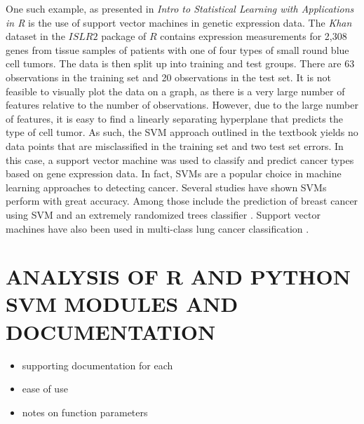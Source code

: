 \documentclass[12pt]{article}
\begin{document}
One such example, as presented in \textit{Intro to Statistical Learning with Applications in R} \citep{introstatlearning} is the use of support vector machines in genetic expression data. The \textit{Khan} dataset in the $ISLR2$ package of $R$ contains expression measurements for 2,308 genes from tissue samples of patients with one of four types of small round blue cell tumors. The data is then split up into training and test groups. There are 63 observations in the training set and 20 observations in the test set. It is not feasible to visually plot the data on a graph, as there is a very large number of features relative to the number of observations. However, due to the large number of features, it is easy to find a linearly separating hyperplane that predicts the type of cell tumor. As such, the SVM approach outlined in the textbook yields no data points that are misclassified in the training set and two test set errors. In this case, a support vector machine was used to classify and predict cancer types based on gene expression data. In fact, SVMs are a popular choice in machine learning approaches to detecting cancer. Several studies have shown SVMs perform with great accuracy. Among those include the prediction of breast cancer using SVM and an extremely randomized trees classifier \cite{breastcancer}. Support vector machines have also been used in multi-class lung cancer classification \cite{lungcancer}.

\section{ANALYSIS OF R AND PYTHON SVM MODULES AND DOCUMENTATION}

\begin{itemize}
    \item supporting documentation for each
    \item ease of use
    \item notes on function parameters
\end{itemize}

\newpage
\thispagestyle{empty}


\end{document}
